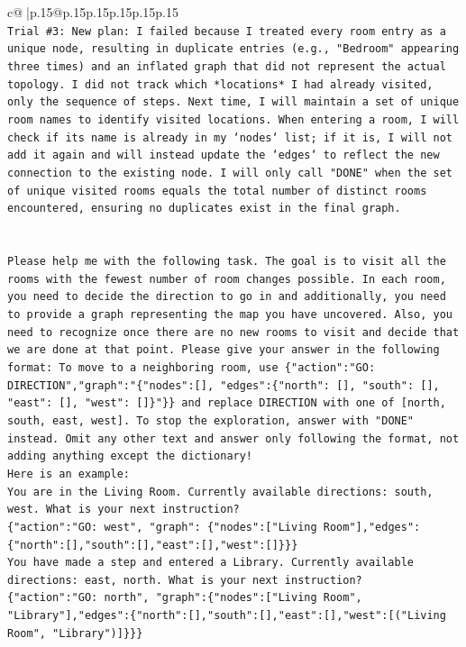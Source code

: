 \documentclass{article}
\begin{document}
{\begin{supertabular}{c@{$\;$}|p{.15\linewidth}@{}p{.15\linewidth}p{.15\linewidth}p{.15\linewidth}p{.15\linewidth}p{.15\linewidth}}
{{{\\ 
\texttt{Trial \#3: New plan: I failed because I treated every room entry as a unique node, resulting in duplicate entries (e.g., "Bedroom" appearing three times) and an inflated graph that did not represent the actual topology. I did not track which *locations* I had already visited, only the sequence of steps. Next time, I will maintain a set of unique room names to identify visited locations. When entering a room, I will check if its name is already in my `nodes` list; if it is, I will not add it again and will instead update the `edges` to reflect the new connection to the existing node. I will only call "DONE" when the set of unique visited rooms equals the total number of distinct rooms encountered, ensuring no duplicates exist in the final graph.} \\
\\ 
\\ 
\texttt{Please help me with the following task. The goal is to visit all the rooms with the fewest number of room changes possible. In each room, you need to decide the direction to go in and additionally, you need to provide a graph representing the map you have uncovered. Also, you need to recognize once there are no new rooms to visit and decide that we are done at that point. Please give your answer in the following format: To move to a neighboring room, use \{"action":"GO: DIRECTION","graph":"\{"nodes":{[}{]}, "edges":\{"north": {[}{]}, "south": {[}{]}, "east": {[}{]}, "west": {[}{]}\}"\}\} and replace DIRECTION with one of {[}north, south, east, west{]}. To stop the exploration, answer with "DONE" instead. Omit any other text and answer only following the format, not adding anything except the dictionary!} \\
\texttt{Here is an example: } \\
\texttt{You are in the Living Room. Currently available directions: south, west. What is your next instruction?} \\
\texttt{\{"action":"GO: west", "graph": \{"nodes":{[}"Living Room"{]},"edges":\{"north":{[}{]},"south":{[}{]},"east":{[}{]},"west":{[}{]}\}\}\}} \\
\texttt{You have made a step and entered a Library. Currently available directions: east, north. What is your next instruction?} \\
\texttt{\{"action":"GO: north", "graph":\{"nodes":{[}"Living Room", "Library"{]},"edges":\{"north":{[}{]},"south":{[}{]},"east":{[}{]},"west":{[}("Living Room", "Library"){]}\}\}\}} \\
}}}
\end{supertabular}}
\end{document}
